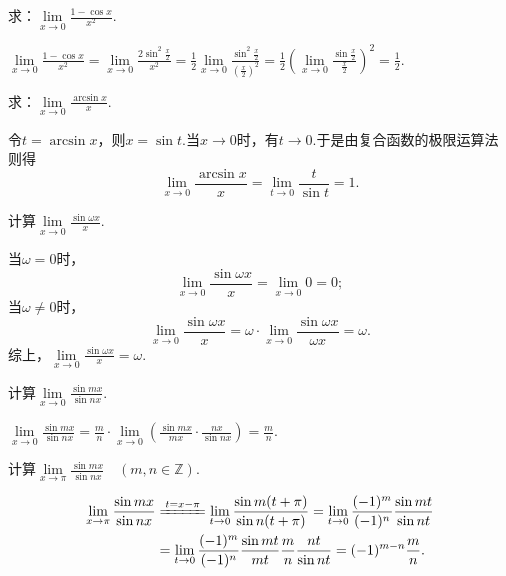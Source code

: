 \begin{example}
\def\l{\lim\limits_{x\to0}}
求：\(\l \frac{1 - \cos x}{x^2}\).
\begin{solution}
\(
\l \frac{1 - \cos x}{x^2}
= \l \frac{2 \sin^2\frac{x}{2}}{x^2}
= \frac{1}{2} \l \frac{\sin^2\frac{x}{2}}{\left(\frac{x}{2}\right)^2}
= \frac{1}{2} \left(\l \frac{\sin \frac{x}{2}}{\frac{x}{2}}\right)^2
= \frac{1}{2}.
\)
\end{solution}
\end{example}

\begin{example}
求：\(\lim\limits_{x\to0}\frac{\arcsin x}{x}\).
\begin{solution}
令\(t = \arcsin x\)，则\(x = \sin t\).当\(x\to0\)时，有\(t\to0\).于是由复合函数的极限运算法则得\[
\lim\limits_{x\to0}\frac{\arcsin x}{x}
= \lim\limits_{t\to0}\frac{t}{\sin t}
= 1.
\]
\end{solution}
\end{example}

\begin{example}
\def\l{\lim\limits_{x\to0}}
计算\(\l \frac{\sin \omega x}{x}\).
\begin{solution}
当\(\omega=0\)时，\[
\l \frac{\sin \omega x}{x} = \l 0 = 0;
\]当\(\omega\neq0\)时，\[
\l \frac{\sin \omega x}{x}
= \omega \cdot \l \frac{\sin \omega x}{\omega x}
= \omega.
\]综上，\(\l \frac{\sin \omega x}{x} = \omega\).
\end{solution}
\end{example}

\begin{example}
\def\l{\lim\limits_{x\to0}}
计算\(\l \frac{\sin mx}{\sin nx}\).
\begin{solution}
\(
\l \frac{\sin mx}{\sin nx}
= \frac{m}{n} \cdot \l \left( \frac{\sin mx}{mx} \cdot \frac{nx}{\sin nx} \right)
= \frac{m}{n}
\).
\end{solution}
\end{example}

\begin{example}
\def\l#1{\lim\limits_{#1}}
计算\(\l{x\to\pi} \frac{\sin mx}{\sin nx} \quad(m,n\in\mathbb{Z})\).
\begin{solution}
\begin{align*}
\l{x\to\pi} \frac{\sin mx}{\sin nx}
&\xlongequal{t=x-\pi}
\l{t\to0} \frac{\sin m(t+\pi)}{\sin n(t+\pi)}
= \l{t\to0} \frac{(-1)^m}{(-1)^n} \frac{\sin mt}{\sin nt} \\
&= \l{t\to0} \frac{(-1)^m}{(-1)^n} \frac{\sin mt}{mt} \frac{m}{n} \frac{nt}{\sin nt}
= (-1)^{m-n} \frac{m}{n}.
\end{align*}
\end{solution}
\end{example}

